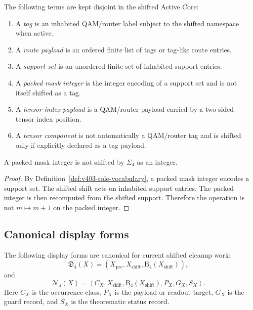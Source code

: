 \begin{definition}
\label{def:v403-role-vocabulary}
The following terms are kept disjoint in the shifted Active Core:
\begin{enumerate}[leftmargin=*]
 \item A \emph{tag} is an inhabited QAM/router label subject to the shifted
 namespace when active.
 \item A \emph{route payload} is an ordered finite list of tags or tag-like
 route entries.
 \item A \emph{support set} is an unordered finite set of inhabited support
 entries.
 \item A \emph{packed mask integer} is the integer encoding of a support set
 and is not itself shifted as a tag.
 \item A \emph{tensor-index payload} is a QAM/router payload carried by a
 two-sided tensor index position.
 \item A \emph{tensor component} is not automatically a QAM/router tag and is
 shifted only if explicitly declared as a tag payload.
\end{enumerate}
\end{definition}

\begin{lemma}
\label{lem:v403-packed-mask-is-not-tag}
A packed mask integer is not shifted by $\Sigma_4$ as an integer.
\end{lemma}

\begin{proof}
By Definition~\ref{def:v403-role-vocabulary}, a packed mask integer encodes a
support set. The shifted shift acts on inhabited support entries. The packed
integer is then recomputed from the shifted support. Therefore the operation is
not $m\mapsto m+1$ on the packed integer.
\end{proof}

\subsection{Canonical display forms}
\label{subsec:v403-canonical-display-forms}

\begin{definition}
\label{def:v403-canonical-display-forms}
The following display forms are canonical for current shifted cleanup work:
\[
 \mathfrak D_4(X)
 =
 (X_{\mathrm{pre}},X_{\mathrm{shift}},\mathrm B_4(X_{\mathrm{shift}})),
\]
and
\[
 \mathcal N_4(X)
 =
 (C_X,X_{\mathrm{shift}},\mathrm B_4(X_{\mathrm{shift}}),P_X,G_X,S_X).
\]
Here $C_X$ is the occurrence class, $P_X$ is the payload or readout target,
$G_X$ is the guard record, and $S_X$ is the theorematic status record.
\end{definition}

